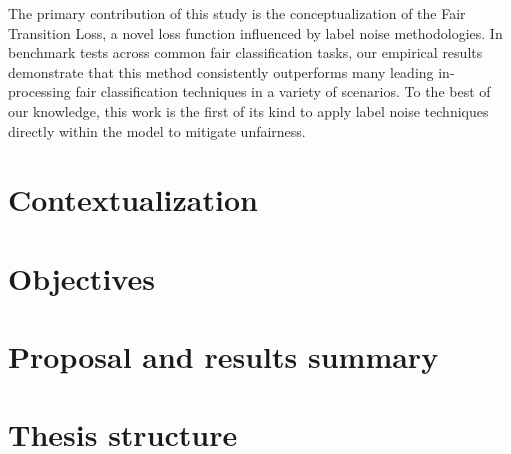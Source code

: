 The primary contribution of this study is the conceptualization of the Fair Transition Loss, a novel loss function influenced by label noise methodologies. In benchmark tests across common fair classification tasks, our empirical results demonstrate that this method consistently outperforms many leading in-processing fair classification techniques in a variety of scenarios. To the best of our knowledge, this work is the first of its kind to apply label noise techniques directly within the model to mitigate unfairness. 



\section{Contextualization}

\section{Objectives}

\section{Proposal and results summary}

\section{Thesis structure}
